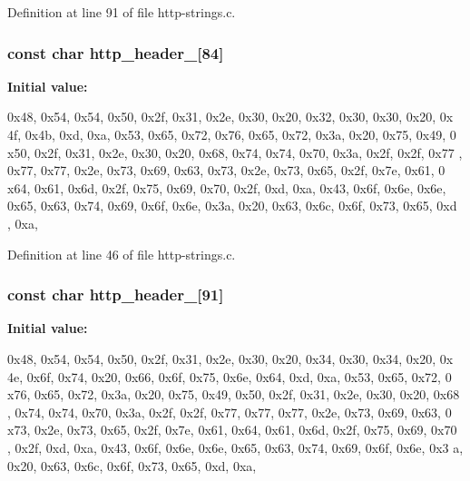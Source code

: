 Definition at line 91 of file http-\/strings.c.

\hypertarget{http-strings_8c_af0c31564afc8cb5ffe3006045593564a}{
\subsubsection[{http\_\-header\_\-200}]{\setlength{\rightskip}{0pt plus 5cm}const char {\bf http\_\-header\_}\mbox{[}84\mbox{]}}}
\label{http-strings_8c_af0c31564afc8cb5ffe3006045593564a}
{\bfseries Initial value:}
\begin{DoxyCode}
 

{0x48, 0x54, 0x54, 0x50, 0x2f, 0x31, 0x2e, 0x30, 0x20, 0x32, 0x30, 0x30, 0x20, 0x
      4f, 0x4b, 0xd, 0xa, 0x53, 0x65, 0x72, 0x76, 0x65, 0x72, 0x3a, 0x20, 0x75, 0x49, 0
      x50, 0x2f, 0x31, 0x2e, 0x30, 0x20, 0x68, 0x74, 0x74, 0x70, 0x3a, 0x2f, 0x2f, 0x77
      , 0x77, 0x77, 0x2e, 0x73, 0x69, 0x63, 0x73, 0x2e, 0x73, 0x65, 0x2f, 0x7e, 0x61, 0
      x64, 0x61, 0x6d, 0x2f, 0x75, 0x69, 0x70, 0x2f, 0xd, 0xa, 0x43, 0x6f, 0x6e, 0x6e, 
      0x65, 0x63, 0x74, 0x69, 0x6f, 0x6e, 0x3a, 0x20, 0x63, 0x6c, 0x6f, 0x73, 0x65, 0xd
      , 0xa, }
\end{DoxyCode}


Definition at line 46 of file http-\/strings.c.

\hypertarget{http-strings_8c_ae076ba5c11f61efb98c599b3252ea8e7}{
\subsubsection[{http\_\-header\_\-404}]{\setlength{\rightskip}{0pt plus 5cm}const char {\bf http\_\-header\_}\mbox{[}91\mbox{]}}}
\label{http-strings_8c_ae076ba5c11f61efb98c599b3252ea8e7}
{\bfseries Initial value:}
\begin{DoxyCode}
 

{0x48, 0x54, 0x54, 0x50, 0x2f, 0x31, 0x2e, 0x30, 0x20, 0x34, 0x30, 0x34, 0x20, 0x
      4e, 0x6f, 0x74, 0x20, 0x66, 0x6f, 0x75, 0x6e, 0x64, 0xd, 0xa, 0x53, 0x65, 0x72, 0
      x76, 0x65, 0x72, 0x3a, 0x20, 0x75, 0x49, 0x50, 0x2f, 0x31, 0x2e, 0x30, 0x20, 0x68
      , 0x74, 0x74, 0x70, 0x3a, 0x2f, 0x2f, 0x77, 0x77, 0x77, 0x2e, 0x73, 0x69, 0x63, 0
      x73, 0x2e, 0x73, 0x65, 0x2f, 0x7e, 0x61, 0x64, 0x61, 0x6d, 0x2f, 0x75, 0x69, 0x70
      , 0x2f, 0xd, 0xa, 0x43, 0x6f, 0x6e, 0x6e, 0x65, 0x63, 0x74, 0x69, 0x6f, 0x6e, 0x3
      a, 0x20, 0x63, 0x6c, 0x6f, 0x73, 0x65, 0xd, 0xa, }
\end{DoxyCode}


